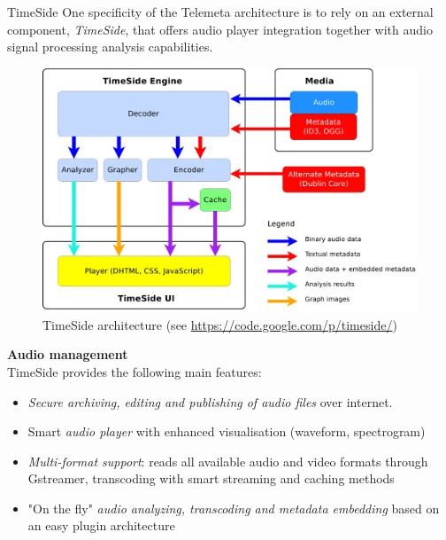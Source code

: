 \documentclass[final, hyperref, table]{beamer}
\begin{document}
\begin{frame}{}
\begin{columns}[t]
\begin{column}[T]{.49\linewidth}
  \begin{block}{TimeSide}\small
One specificity of the Telemeta architecture is to rely on an external component, \emph{TimeSide}, that offers audio player integration together with audio signal processing analysis capabilities.
    \begin{figure}[htbp]
  \centering
  \includegraphics[width=0.4\paperwidth]{../img/timeside_schema.pdf}
  \caption{TimeSide architecture (see \url{https://code.google.com/p/timeside/})}\label{fig:TimeSide_Archi}
\end{figure}
\textbf{Audio management}\\
TimeSide provides the following main features:
\begin{itemize}
\item \emph{Secure archiving, editing and publishing of audio files} over
  internet.
\item Smart \emph{audio player} with enhanced visualisation (waveform, spectrogram)
\item \emph{Multi-format support}: reads all available audio and video formats  through Gstreamer, transcoding with smart streaming and caching methods
\item "On the fly" \emph{audio analyzing, transcoding and metadata
    embedding} based on an easy plugin architecture
\end{itemize}


\end{block}
\end{column}
\end{columns}
\end{frame}
\end{document}
